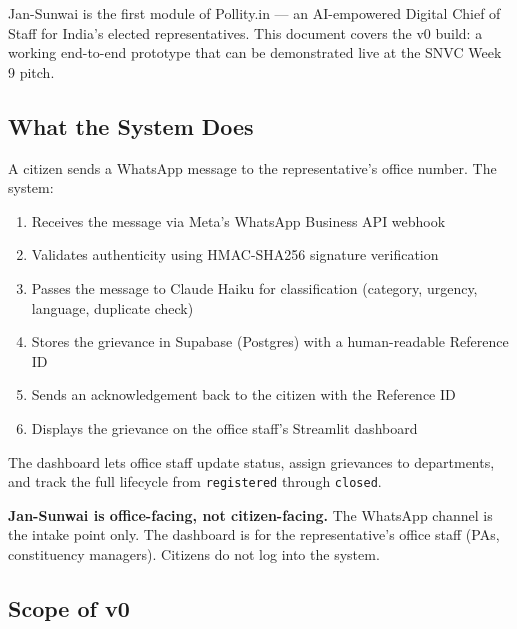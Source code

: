 \documentclass[11pt, a4paper]{article}
\begin{document}
Jan-Sunwai is the first module of Pollity.in — an AI-empowered Digital Chief of Staff for India's elected representatives. This document covers the v0 build: a working end-to-end prototype that can be demonstrated live at the SNVC Week 9 pitch.

\subsection{What the System Does}

A citizen sends a WhatsApp message to the representative's office number. The system:
\begin{enumerate}[leftmargin=1.5em]
  \item Receives the message via Meta's WhatsApp Business API webhook
  \item Validates authenticity using HMAC-SHA256 signature verification
  \item Passes the message to Claude Haiku for classification (category, urgency, language, duplicate check)
  \item Stores the grievance in Supabase (Postgres) with a human-readable Reference ID
  \item Sends an acknowledgement back to the citizen with the Reference ID
  \item Displays the grievance on the office staff's Streamlit dashboard
\end{enumerate}

The dashboard lets office staff update status, assign grievances to departments, and track the full lifecycle from \texttt{registered} through \texttt{closed}.

\begin{notebox}
\textbf{Jan-Sunwai is office-facing, not citizen-facing.} The WhatsApp channel is the intake point only. The dashboard is for the representative's office staff (PAs, constituency managers). Citizens do not log into the system.
\end{notebox}

\subsection{Scope of v0}
\end{document}
